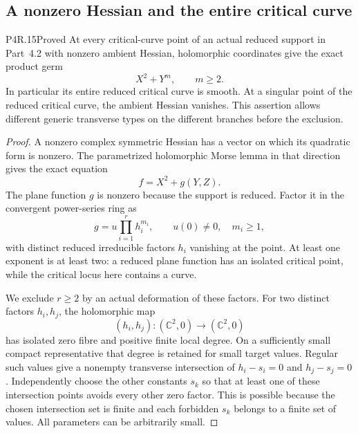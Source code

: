 \subsection{A nonzero Hessian and the entire critical curve}

\begin{statement}{P4R.15}{Proved}
At every critical-curve point of an actual reduced support in
Part~4.2 with nonzero ambient Hessian, holomorphic coordinates
give the exact product germ
\[
                       X^2+Y^m,\qquad m\ge2.
\]
In particular its entire reduced critical curve is smooth.
At a singular point of the reduced critical curve, the ambient
Hessian vanishes. This assertion allows different generic
transverse types on the different branches before the exclusion.
\end{statement}
\begin{proof}
A nonzero complex symmetric Hessian has a vector on which its
quadratic form is nonzero. The parametrized holomorphic Morse
lemma in that direction gives the exact equation
\[
                        f=X^2+g(Y,Z).
\]
The plane function $g$ is nonzero because the support is
reduced. Factor it in the convergent power-series ring as
\[
             g=u\prod_{i=1}^{r}h_i^{m_i},
             \qquad u(0)\ne0,\quad m_i\ge1,
\]
with distinct reduced irreducible factors $h_i$ vanishing at
the point. At least one exponent is at least two: a reduced
plane function has an isolated critical point, while the
critical locus here contains a curve.

We exclude $r\ge2$ by an actual deformation of these factors.
For two distinct factors $h_i,h_j$, the holomorphic map
\[
 (h_i,h_j):(\mathbb C^2,0)\longrightarrow(\mathbb C^2,0)
\]
has isolated zero fibre and positive finite local degree.
On a sufficiently small compact representative that degree
is retained for small target values. Regular such values
give a nonempty transverse intersection of
$h_i-s_i=0$ and $h_j-s_j=0$. Independently choose the
other constants $s_k$ so that at least one of these
intersection points avoids every other zero factor. This
is possible because the chosen intersection set is finite
and each forbidden $s_k$ belongs to a finite set of values.
All parameters can be arbitrarily small.


\end{proof}
